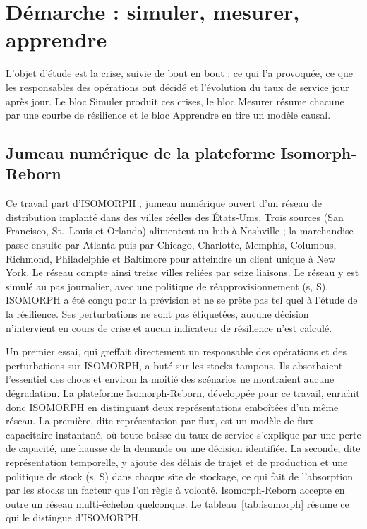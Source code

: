\section{Démarche : simuler, mesurer, apprendre}
\label{sec:3}

L'objet d'étude est la crise, suivie de bout en bout : ce qui l'a provoquée, ce que les responsables des opérations ont décidé et l'évolution du taux de service jour après jour. Le bloc Simuler produit ces crises, le bloc Mesurer résume chacune par une courbe de résilience et le bloc Apprendre en tire un modèle causal.

\subsection{Jumeau numérique de la plateforme Isomorph-Reborn}
\label{sec:3.1}

Ce travail part d'ISOMORPH \citep{zhang2026isomorph}, jumeau numérique ouvert d'un réseau de distribution implanté dans des villes réelles des États-Unis. Trois sources (San Francisco, St.~Louis et Orlando) alimentent un hub à Nashville ; la marchandise passe ensuite par Atlanta puis par Chicago, Charlotte, Memphis, Columbus, Richmond, Philadelphie et Baltimore pour atteindre un client unique à New York. Le réseau compte ainsi treize villes reliées par seize liaisons. Le réseau y est simulé au pas journalier, avec une politique de réapprovisionnement (s, S). ISOMORPH a été conçu pour la prévision et ne se prête pas tel quel à l'étude de la résilience. Ses perturbations ne sont pas étiquetées, aucune décision n'intervient en cours de crise et aucun indicateur de résilience n'est calculé.

Un premier essai, qui greffait directement un responsable des opérations et des perturbations sur ISOMORPH, a buté sur les stocks tampons. Ils absorbaient l'essentiel des chocs et environ la moitié des scénarios ne montraient aucune dégradation. La plateforme Isomorph-Reborn, développée pour ce travail, enrichit donc ISOMORPH en distinguant deux représentations emboîtées d'un même réseau. La première, dite représentation par flux, est un modèle de flux capacitaire instantané, où toute baisse du taux de service s'explique par une perte de capacité, une hausse de la demande ou une décision identifiée. La seconde, dite représentation temporelle, y ajoute des délais de trajet et de production et une politique de stock (s, S) dans chaque site de stockage, ce qui fait de l'absorption par les stocks un facteur que l'on règle à volonté. Isomorph-Reborn accepte en outre un réseau multi-échelon quelconque. Le tableau~\ref{tab:isomorph} résume ce qui le distingue d'ISOMORPH.

